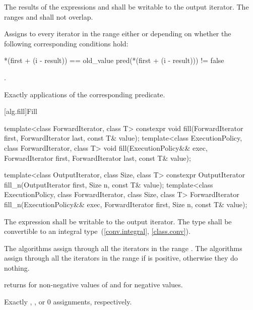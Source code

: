 \begin{itemdescr}
\pnum
\requires
The results of the expressions
and
shall be writable to the
output iterator.
The ranges
and
shall not overlap.

\pnum
\effects
Assigns to every iterator
in the
range
either
or
depending on whether the following corresponding conditions hold:

\begin{codeblock}
*(first + (i - result)) == old_value
pred(*(first + (i - result))) != false
\end{codeblock}

\pnum
\returns
{}.

\pnum
\complexity
Exactly
applications of the corresponding predicate.
\end{itemdescr}

[alg.fill]{Fill}

%
%
\begin{itemdecl}
template<class ForwardIterator, class T>
  constexpr void fill(ForwardIterator first, ForwardIterator last, const T& value);
template<class ExecutionPolicy, class ForwardIterator, class T>
  void fill(ExecutionPolicy&& exec,
            ForwardIterator first, ForwardIterator last, const T& value);

template<class OutputIterator, class Size, class T>
  constexpr OutputIterator fill_n(OutputIterator first, Size n, const T& value);
template<class ExecutionPolicy, class ForwardIterator, class Size, class T>
  ForwardIterator fill_n(ExecutionPolicy&& exec,
                         ForwardIterator first, Size n, const T& value);

\end{itemdecl}

\begin{itemdescr}
\pnum
\requires
The expression
shall be writable to the output iterator. The type
shall be convertible to an integral type~(\ref{conv.integral}, \ref{class.conv}).

\pnum
\effects
The  algorithms assign  through all the iterators in the range
. The  algorithms assign 
through all the iterators in the range 
if  is positive, otherwise they do nothing.

\pnum
\returns {} returns  for non-negative values of 
and  for negative values.

\pnum
\complexity
Exactly
,
, or 0 assignments, respectively.
\end{itemdescr}

